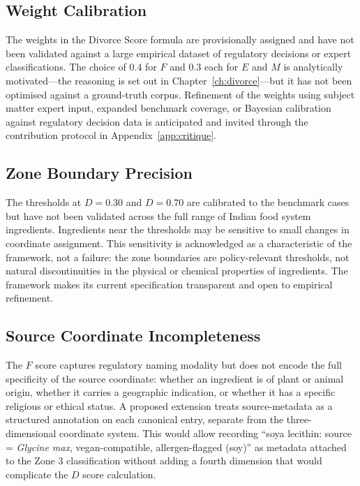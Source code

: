 \documentclass[12pt,a3paper]{article}
\begin{document}
\subsection{Weight Calibration}

The weights in the Divorce Score formula are provisionally assigned and have not been validated against a large empirical dataset of regulatory decisions or expert classifications. The choice of 0.4 for $F$ and 0.3 each for $E$ and $M$ is analytically motivated---the reasoning is set out in Chapter~\ref{ch:divorce}---but it has not been optimised against a ground-truth corpus. Refinement of the weights using subject matter expert input, expanded benchmark coverage, or Bayesian calibration against regulatory decision data is anticipated and invited through the contribution protocol in Appendix~\ref{app:critique}.

\subsection{Zone Boundary Precision}

The thresholds at $D = 0.30$ and $D = 0.70$ are calibrated to the benchmark cases but have not been validated across the full range of Indian food system ingredients. Ingredients near the thresholds may be sensitive to small changes in coordinate assignment. This sensitivity is acknowledged as a characteristic of the framework, not a failure: the zone boundaries are policy-relevant thresholds, not natural discontinuities in the physical or chemical properties of ingredients. The framework makes its current specification transparent and open to empirical refinement.

\subsection{Source Coordinate Incompleteness}

The $F$ score captures regulatory naming modality but does not encode the full specificity of the source coordinate: whether an ingredient is of plant or animal origin, whether it carries a geographic indication, or whether it has a specific religious or ethical status. A proposed extension treats source-metadata as a structured annotation on each canonical entry, separate from the three-dimensional coordinate system. This would allow recording ``soya lecithin: source = \textit{Glycine max}, vegan-compatible, allergen-flagged (soy)'' as metadata attached to the Zone 3 classification without adding a fourth dimension that would complicate the $D$ score calculation.
\end{document}
